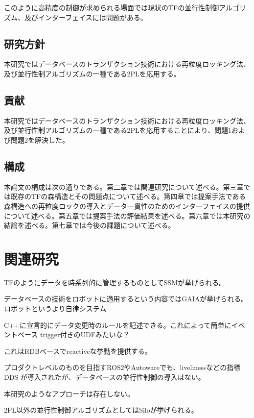\documentclass[a4paper]{jreport}	%
\begin{document}
このように高精度の制御が求められる場面では現状のTFの並行性制御アルゴリズム、及びインターフェイスには問題がある。

\section{研究方針}
本研究ではデータベースのトランザクション技術における再粒度ロッキング法、及び並行性制アルゴリズムの一種である2PLを応用する。


\section{貢献}
本研究ではデータベースのトランザクション技術における再粒度ロッキング法、及び並行性制アルゴリズムの一種である2PLを応用することにより、問題1および問題2を解決した。



\section{構成}
本論文の構成は次の通りである。第二章では関連研究について述べる。第三章では既存のTFの森構造とその問題点について述べる。第四章では提案手法である森構造への再粒度ロックの導入とデータ一貫性のためのインターフェイスの提供について述べる。第五章では提案手法の評価結果を述べる。第六章では本研究の結論を述べる。第七章では今後の課題について述べる。


\chapter{関連研究}

TFのようにデータを時系列的に管理するものとしてSSMが挙げられる。


データベースの技術をロボットに適用するという内容ではGAIA\cite{gaia}が挙げられる。
ロボットというより自律システム

C++に宣言的にデータ変更時のルールを記述できる。これによって簡単にイベントベース
trigger付きのUDFみたいな？

これはRDBベースでreactiveな挙動を提供する。


プロダクトレベルのものを目指すROS2\cite{ros2}やAutoware\cite{autoware}でも、livelinessなどの指標
DDS
が導入されたが、データベースの並行性制御の導入はない。



本研究のようなアプローチは存在しない。


2PL以外の並行性制御アルゴリズムとしてはSilo\cite{silo}が挙げられる。
\end{document}
